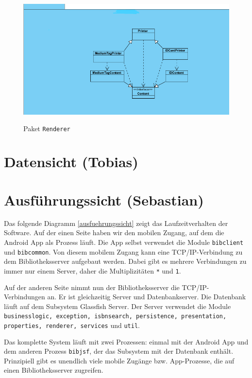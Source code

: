 \documentclass[fontsize=12pt,paper=a4,twoside]{scrartcl}
\begin{document}
\begin{figure} [H] 
\caption{Paket \texttt{Renderer}} \centering
 \includegraphics[width=1\textwidth]{Diagramme/Renderer.png} 
 \label{Renderer} 
\end{figure}



\section{Datensicht (Tobias)}
\label{sec:datensicht}


\section{Ausführungssicht (Sebastian)}

Das folgende Diagramm \vref{ausfuehrungssicht} zeigt das Laufzeitverhalten der Software.
Auf der einen Seite haben wir den mobilen Zugang, auf dem die Android App als Prozess läuft. Die App selbst verwendet die Module \texttt{bibclient} und \texttt{bibcommon}. Von diesem mobilem Zugang kann eine TCP/IP-Verbindung zu dem Bibliotheksserver aufgebaut werden. Dabei gibt es mehrere Verbindungen zu immer nur einem Server, daher die Multiplizitäten \texttt{*} und \texttt{1}.

Auf der anderen Seite nimmt nun der Bibliotheksserver die TCP/IP-Verbindungen an. Er ist gleichzeitig Server und Datenbankserver. Die Datenbank läuft auf dem Subsystem Glassfish Server. Der Server verwendet die Module \texttt{businesslogic, exception, isbnsearch, persistence, presentation, properties, renderer, services} und \texttt{util}.

Das komplette System läuft mit zwei Prozessen: einmal mit der Android App und dem anderen Prozess \texttt{bibjsf}, der das Subsystem mit der Datenbank enthält. Prinzipiell gibt es unendlich viele mobile Zugänge bzw. App-Prozesse, die auf einen Bibliotheksserver zugreifen.
\end{document}
